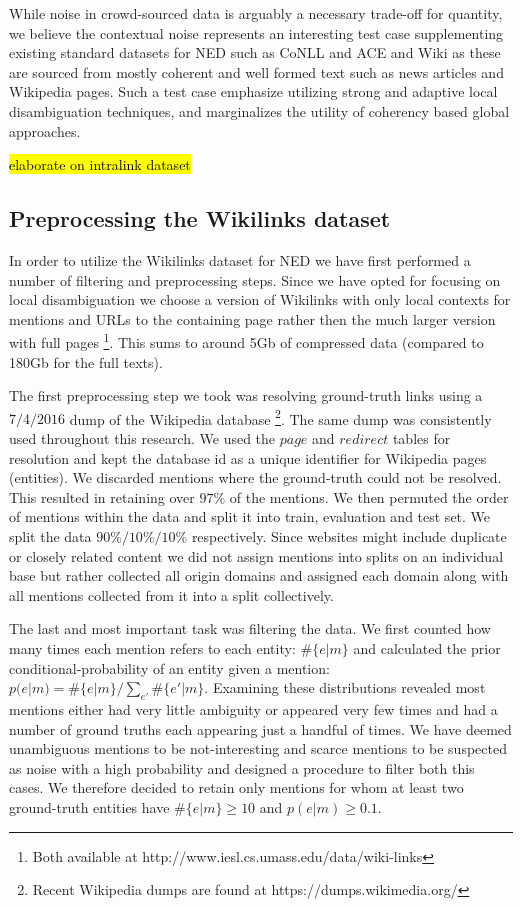 \documentclass[11pt]{article}
\begin{document}
	While noise in crowd-sourced data is arguably a necessary trade-off for quantity, we believe the contextual noise represents an interesting test case supplementing existing standard datasets for NED such as CoNLL \cite{hoffart2011robust} and ACE and Wiki \cite{ratinov2011local} as these are sourced from mostly coherent and well formed text such as news articles and Wikipedia pages. Such a test case emphasize utilizing strong and adaptive local disambiguation techniques, and marginalizes the utility of coherency based global approaches.
	
	\hl{elaborate on intralink dataset}
	
	\subsection{Preprocessing the Wikilinks dataset}
	
	In order to utilize the Wikilinks dataset for NED we have first performed a number of filtering and preprocessing steps. Since we have opted for focusing on local disambiguation we choose a version of Wikilinks with only local contexts for mentions and URLs to the containing page rather then the much larger version with full pages \footnote{Both available at http://www.iesl.cs.umass.edu/data/wiki-links}. This sums to around 5Gb of compressed data (compared to 180Gb for the full texts).
	
	The first preprocessing step we took was resolving ground-truth links using a $7/4/2016$ dump of the Wikipedia database \footnote{Recent Wikipedia dumps are found at https://dumps.wikimedia.org/}. The same dump was consistently used throughout this research. We used the $page$ and $redirect$ tables for resolution and kept the database id as a unique identifier for Wikipedia pages (entities). We discarded mentions where the ground-truth could not be resolved. This resulted in retaining over $97\%$ of the mentions. We then permuted the order of mentions within the data and split it into train, evaluation and test set. We split the data $90\% / 10\% / 10\%$ respectively. Since websites might include duplicate or closely related content we did not assign mentions into splits on an individual base but rather collected all origin domains and assigned each domain along with all mentions collected from it into a split collectively.
	
	The last and most important task was filtering the data. We first counted how many times each mention refers to each entity: $\#\{e|m\}$ and calculated the prior conditional-probability of an entity given a mention: $p(e|m)=\#\{e|m\}/\sum_{e'}\#\{e'|m\}$. Examining these distributions revealed most mentions either had very little ambiguity or appeared very few times and had a number of ground truths each appearing just a handful of times. We have deemed unambiguous mentions to be not-interesting and scarce mentions to be suspected as noise with a high probability and designed a procedure to filter both this cases. We therefore decided to retain only mentions for whom at least two ground-truth entities have $\#\{e|m\}\ge 10$ and $p(e|m)\ge0.1$. 
	
\end{document}

